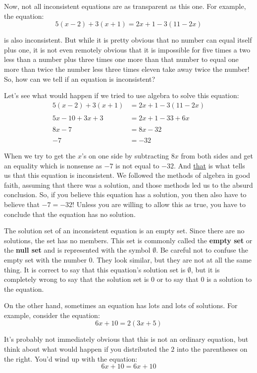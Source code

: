 Now, not all inconsistent equations are as transparent as this one. For example, the equation:
$$5(x-2)+3(x+1)=2x+1-3(11-2x)$$

is also inconsistent. But while it is pretty obvious that no number can equal itself plus one, it is not even remotely obvious that it is impossible for five times a two less than a number plus three times one more than that number to equal one more than twice the number less three times eleven take away twice the number! So, how can we tell if an equation is inconsistent?

Let’s see what would happen if we tried to use algebra to solve this equation:
\begin{align*}
	5(x-2)+3(x+1)&=2x+1-3(11-2x)\\
	\\
	5x-10+3x+3&=2x+1-33+6x\\
	\\
	8x-7&=8x-32\\
	\\
	-7&=-32
\end{align*}

When we try to get the $x$'s on one side by subtracting $8x$ from both sides and get an equality which is nonsense as $-7$ is not equal to $-32$.  And \underline{that} is what tells us that this equation is inconsistent. We followed the methods of algebra in good faith, assuming that there was a solution, and those methods led us to the absurd conclusion. So, if you believe this equation has a solution, you then also have to believe that $-7=-32$!  Unless you are willing to allow this as true, you have to conclude that the equation has no solution.

The solution set of an inconsistent equation is an empty set. Since there are no solutions, the set has no members. This set is commonly called the \textbf{empty set} or the \textbf{null set} and is represented with the symbol $\emptyset$. Be careful not to confuse the empty set with the number $0$. They look similar, but they are not at all the same thing. It is correct to say that this equation’s solution set is $\emptyset$, but it is completely wrong to say that the solution set is $0$ or to say that $0$ is a solution to the equation.

On the other hand, sometimes an equation has lots and lots of solutions. For example, consider the equation:
$$6x+10=2(3x+5)$$

It’s probably not immediately obvious that this is not an ordinary equation, but think about what would happen if you distributed the $2$ into the parentheses on the right. You’d wind up with the equation:
$$6x+10=6x+10$$

